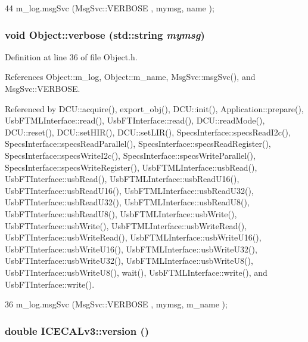 \begin{DoxyCode}
44 { m_log.msgSvc (MsgSvc::VERBOSE , mymsg, name ); }
\end{DoxyCode}
\hypertarget{classObject_a83d2db2df682907ea1115ad721c1c4a1}{
\subsubsection[{verbose}]{\setlength{\rightskip}{0pt plus 5cm}void Object::verbose (std::string {\em mymsg})}}
\label{classObject_a83d2db2df682907ea1115ad721c1c4a1}


Definition at line 36 of file Object.h.

References Object::m\_\-log, Object::m\_\-name, MsgSvc::msgSvc(), and MsgSvc::VERBOSE.

Referenced by DCU::acquire(), export\_\-obj(), DCU::init(), Application::prepare(), UsbFTMLInterface::read(), UsbFTInterface::read(), DCU::readMode(), DCU::reset(), DCU::setHIR(), DCU::setLIR(), SpecsInterface::specsReadI2c(), SpecsInterface::specsReadParallel(), SpecsInterface::specsReadRegister(), SpecsInterface::specsWriteI2c(), SpecsInterface::specsWriteParallel(), SpecsInterface::specsWriteRegister(), UsbFTMLInterface::usbRead(), UsbFTInterface::usbRead(), UsbFTMLInterface::usbReadU16(), UsbFTInterface::usbReadU16(), UsbFTMLInterface::usbReadU32(), UsbFTInterface::usbReadU32(), UsbFTMLInterface::usbReadU8(), UsbFTInterface::usbReadU8(), UsbFTMLInterface::usbWrite(), UsbFTInterface::usbWrite(), UsbFTMLInterface::usbWriteRead(), UsbFTInterface::usbWriteRead(), UsbFTMLInterface::usbWriteU16(), UsbFTInterface::usbWriteU16(), UsbFTMLInterface::usbWriteU32(), UsbFTInterface::usbWriteU32(), UsbFTMLInterface::usbWriteU8(), UsbFTInterface::usbWriteU8(), wait(), UsbFTMLInterface::write(), and UsbFTInterface::write().


\begin{DoxyCode}
36 { m_log.msgSvc (MsgSvc::VERBOSE , mymsg, m_name ); }
\end{DoxyCode}
\hypertarget{classICECALv3_a7f3f8012d2e5c45f8e43819befa3f915}{
\subsubsection[{version}]{\setlength{\rightskip}{0pt plus 5cm}double ICECALv3::version ()}}
\label{classICECALv3_a7f3f8012d2e5c45f8e43819befa3f915}


